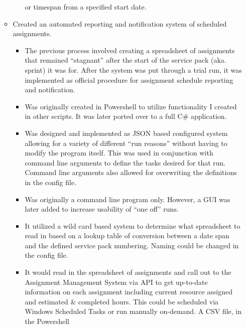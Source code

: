 \documentclass[margin]{res}
\begin{document}
\begin{resume}
\begin{itemize}
\begin{itemize}
\begin{itemize}
                     or timespan from a specified start date.
               \end{itemize}
            \item Created an automated reporting and notification system of scheduled assignments. 
               \begin{itemize}
                  \item The previous process involved creating a spreadsheet of assignments that 
                     remained ``stagnant'' after the start of the service pack (aka. sprint) it was 
                     for. After the system was put through a trial run, it was implemented as official 
                     procedure for assignment schedule reporting and notification.
                  \item Was originally created in Powershell to utilize functionality I created in 
                     other scripts. It was later ported over to a full C\# application.
                  \item Was designed and implemented as JSON based configured system allowing for a 
                      variety of different ``run reasons'' without having to modify the program itself.
                      This was used in conjunction with command line arguments to define the tasks
                      desired for that run. Command line arguments also allowed for overwriting the
                      definitions in the config file.
                  \item Was originally a command line program only. However, a GUI was later added to
                     increase usability of ``one off'' runs.
                  \item It utilized a wild card based system to determine what spreadsheet to read in
                     based on a lookup table of conversion between a date span and the defined service
                     pack numbering. Naming could be changed in the config file.
                  \item It would read in the spreadsheet of assignments and call out to the Assignment
                     Management System via API to get up-to-date \\
                     information on each assignment including
                     current resource assigned and estimated \& completed hours. This could be scheduled
                     via \\
                     Windows Scheduled Tasks or run manually on-demand. A CSV file, in the Powershell 

\end{itemize}
\end{itemize}
\end{itemize}
\end{resume}
\end{document}
